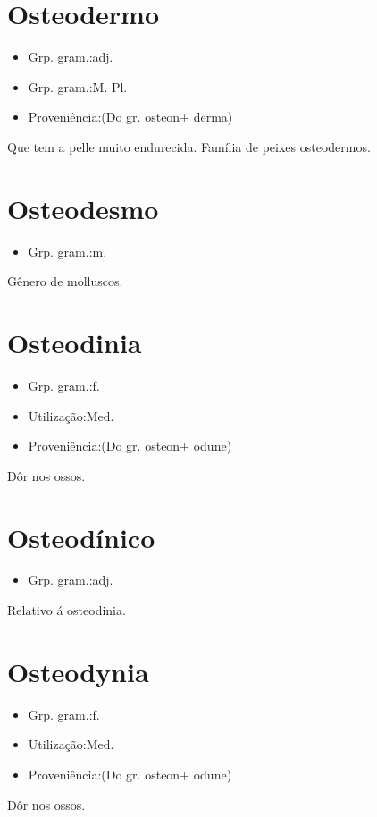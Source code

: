 \section{Osteodermo}
\begin{itemize}
\item {Grp. gram.:adj.}
\end{itemize}
\begin{itemize}
\item {Grp. gram.:M. Pl.}
\end{itemize}
\begin{itemize}
\item {Proveniência:(Do gr. \textunderscore osteon\textunderscore  + \textunderscore derma\textunderscore )}
\end{itemize}
Que tem a pelle muito endurecida.
Família de peixes osteodermos.
\section{Osteodesmo}
\begin{itemize}
\item {Grp. gram.:m.}
\end{itemize}
Gênero de molluscos.
\section{Osteodinia}
\begin{itemize}
\item {Grp. gram.:f.}
\end{itemize}
\begin{itemize}
\item {Utilização:Med.}
\end{itemize}
\begin{itemize}
\item {Proveniência:(Do gr. \textunderscore osteon\textunderscore  + \textunderscore odune\textunderscore )}
\end{itemize}
Dôr nos ossos.
\section{Osteodínico}
\begin{itemize}
\item {Grp. gram.:adj.}
\end{itemize}
Relativo á osteodinia.
\section{Osteodynia}
\begin{itemize}
\item {Grp. gram.:f.}
\end{itemize}
\begin{itemize}
\item {Utilização:Med.}
\end{itemize}
\begin{itemize}
\item {Proveniência:(Do gr. \textunderscore osteon\textunderscore  + \textunderscore odune\textunderscore )}
\end{itemize}
Dôr nos ossos.

